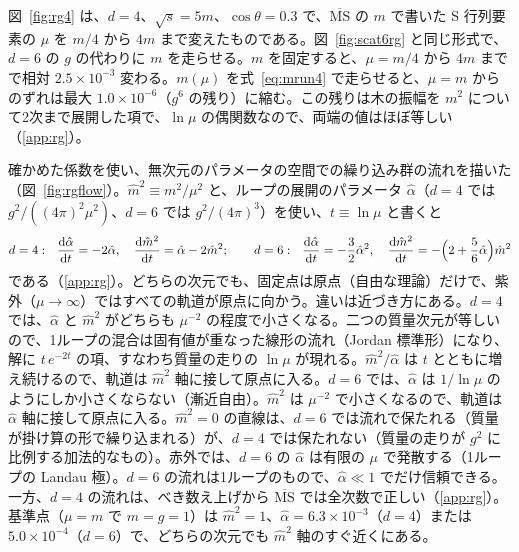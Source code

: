 \documentclass[a4paper,10pt]{ltjsarticle}
\newcommand{\dd}{\mathrm{d}}
\begin{document}
図~\ref{fig:rg4} は、$d=4$、$\sqrt s=5m$、$\cos\theta=0.3$ で、$\overline{\mathrm{MS}}$ の $m$ で書いた S 行列要素の $\mu$ を $m/4$ から $4m$ まで変えたものである。図~\ref{fig:scat6rg} と同じ形式で、$d=6$ の $g$ の代わりに $m$ を走らせる。$m$ を固定すると、$\mu=m/4$ から $4m$ までで相対 $2.5\times10^{-3}$ 変わる。$m(\mu)$ を式~\eqref{eq:mrun4} で走らせると、$\mu=m$ からのずれは最大 $1.0\times10^{-6}$（$g^6$ の残り）に縮む。この残りは木の振幅を $m^2$ について2次まで展開した項で、$\ln\mu$ の偶関数なので、両端の値はほぼ等しい（\ref{app:rg}）。

確かめた係数を使い、無次元のパラメータの空間での繰り込み群の流れを描いた（図~\ref{fig:rgflow}）。$\hat m^2\equiv m^2/\mu^2$ と、ループの展開のパラメータ $\hat\alpha$（$d=4$ では $g^2/((4\pi)^2\mu^2)$、$d=6$ では $g^2/(4\pi)^3$）を使い、$t\equiv\ln\mu$ と書くと
\begin{equation*}
d=4:\ \ \frac{\dd\hat\alpha}{\dd t}=-2\hat\alpha,\quad\frac{\dd\hat m^2}{\dd t}=\hat\alpha-2\hat m^2;\qquad
d=6:\ \ \frac{\dd\hat\alpha}{\dd t}=-\frac32\hat\alpha^2,\quad\frac{\dd\hat m^2}{\dd t}=-\Bigl(2+\frac56\hat\alpha\Bigr)\hat m^2
\end{equation*}
である（\ref{app:rg}）。どちらの次元でも、固定点は原点（自由な理論）だけで、紫外（$\mu\to\infty$）ではすべての軌道が原点に向かう。違いは近づき方にある。$d=4$ では、$\hat\alpha$ と $\hat m^2$ がどちらも $\mu^{-2}$ の程度で小さくなる。二つの質量次元が等しいので、1ループの混合は固有値が重なった線形の流れ（Jordan 標準形）になり、解に $t\,e^{-2t}$ の項、すなわち質量の走りの $\ln\mu$ が現れる。$\hat m^2/\hat\alpha$ は $t$ とともに増え続けるので、軌道は $\hat m^2$ 軸に接して原点に入る。$d=6$ では、$\hat\alpha$ は $1/\ln\mu$ のようにしか小さくならない（漸近自由）。$\hat m^2$ は $\mu^{-2}$ で小さくなるので、軌道は $\hat\alpha$ 軸に接して原点に入る。$\hat m^2=0$ の直線は、$d=6$ では流れで保たれる（質量が掛け算の形で繰り込まれる）が、$d=4$ では保たれない（質量の走りが $g^2$ に比例する加法的なもの）。赤外では、$d=6$ の $\hat\alpha$ は有限の $\mu$ で発散する（1ループの Landau 極）。$d=6$ の流れは1ループのもので、$\hat\alpha\ll1$ でだけ信頼できる。一方、$d=4$ の流れは、べき数え上げから $\overline{\mathrm{MS}}$ では全次数で正しい（\ref{app:rg}）。基準点（$\mu=m$ で $m=g=1$）は $\hat m^2=1$、$\hat\alpha=6.3\times10^{-3}$（$d=4$）または $5.0\times10^{-4}$（$d=6$）で、どちらの次元でも $\hat m^2$ 軸のすぐ近くにある。
\end{document}
